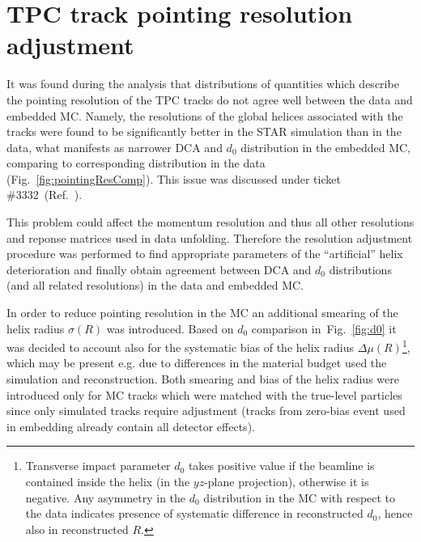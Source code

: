 

\chapter{TPC track pointing resolution adjustment}\label{chap:tpcTrackPointingRes}

It was found during the analysis that distributions of quantities which describe the pointing resolution of the TPC tracks do not agree well between the data and embedded MC. Namely, the resolutions of the global helices associated with the tracks were found to be significantly better in the STAR simulation than in the data, what manifests as narrower DCA and $d_{0}$ distribution in the embedded MC, comparing to corresponding distribution in the data (Fig.~\ref{fig:pointingResComp}). This issue was discussed under ticket \#3332~(Ref.~\cite{dcaTicket}).

This problem could affect the momentum resolution and thus all other resolutions and reponse matrices used in data unfolding. Therefore the resolution adjustment procedure was performed to find appropriate parameters of the ``artificial'' helix deterioration and finally obtain agreement between DCA and $d_{0}$ distributions (and all related resolutions) in the data and embedded MC.

In order to reduce pointing resolution in the MC an additional smearing of the helix radius $\sigma(R)$ was introduced. Based on $d_{0}$ comparison in~Fig.~\ref{fig:d0} it was decided to account also for the systematic bias of the helix radius $\Delta\mu(R)$\footnote{Transverse impact parameter $d_{0}$ takes positive value if the beamline is contained inside the helix (in the $yz$-plane projection), otherwise it is negative. Any asymmetry in the $d_{0}$ distribution in the MC with respect to the data indicates presence of systematic difference in reconstructed $d_{0}$, hence also in reconstructed $R$.}, which may be present e.g. due to differences in the material budget used the simulation and reconstruction. Both smearing and bias of the helix radius were introduced only for MC tracks which were matched with the true-level particles since only simulated tracks require adjustment (tracks from zero-bias event used in embedding already contain all detector effects).


